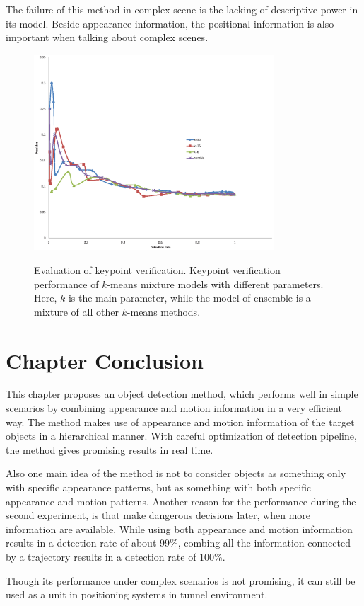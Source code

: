 The failure of this method in complex scene is the lacking of descriptive power in its model. Beside appearance information, the positional information is also important when talking about complex scenes.

\begin{figure}
\centering
{
  \includegraphics[width=0.8\textwidth]{kptkms.eps}
}
\caption[Evaluation of keypoint verification]{Evaluation of keypoint verification. Keypoint verification performance of $k$-means mixture models with different parameters. Here, $k$ is the main parameter, while the model of ensemble is a mixture of all other $k$-means methods.}
\label{ord:one}
\end{figure}

\section{Chapter Conclusion}
\label{conc}
 This chapter proposes an object detection method, which performs well in simple scenarios by combining appearance and motion information in a very efficient way. The method makes use of appearance and motion information of the target objects in a hierarchical manner. With careful optimization of detection pipeline, the method gives promising results in real time.

  Also one main idea of the method is not to consider objects as something only with specific appearance patterns, but as something with both
 specific appearance and motion patterns. Another reason for the performance during the second experiment, is that make dangerous decisions later, when more information are available. While using both appearance and motion information results in a detection rate of about 99\%, combing all the information connected by a trajectory results in a detection rate of 100\%.

 Though its performance under complex scenarios is not promising, it can still be used as a unit in  positioning systems in tunnel environment.
